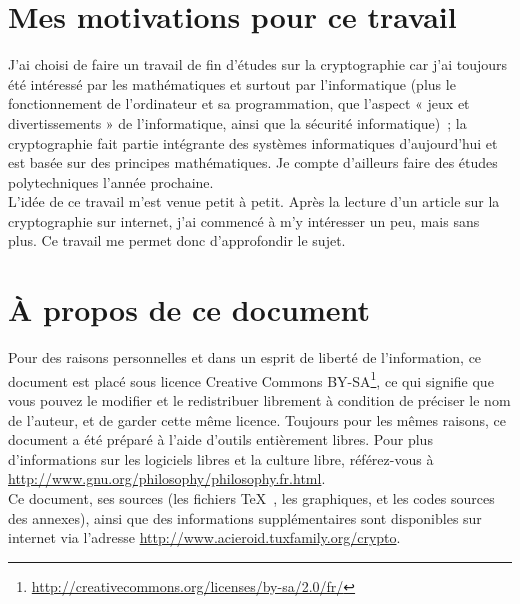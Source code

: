 
\section{Mes motivations pour ce travail}
J'ai choisi de faire un travail de fin d'études sur la cryptographie
car j'ai toujours été intéressé par les mathématiques et surtout par
l'informatique (plus le fonctionnement de l'ordinateur et sa
programmation, que l'aspect « jeux et divertissements » de
l'informatique, ainsi que la sécurité informatique)~;
la cryptographie fait partie intégrante des
systèmes informatiques d'aujourd'hui et est basée sur des principes
mathématiques. Je compte d'ailleurs faire des études polytechniques
l'année prochaine. \\ L'idée de ce travail m'est venue petit à
petit. Après la lecture d'un article sur la cryptographie sur
internet, j'ai commencé à m'y intéresser un peu, mais sans plus.
 Ce travail me permet donc d'approfondir le sujet.

\section{À propos de ce document}
Pour des raisons personnelles et dans un esprit de liberté de
l'information, ce document est placé sous licence Creative Commons
BY-SA\footnote{\url{http://creativecommons.org/licenses/by-sa/2.0/fr/}}, ce qui
signifie que vous pouvez le modifier et le redistribuer librement à
condition de préciser le nom de l'auteur, et de garder cette même
licence. Toujours pour les mêmes raisons, ce document a été préparé à
l'aide d'outils entièrement libres.
Pour plus d'informations sur les logiciels libres et la culture
libre, référez-vous à \url{http://www.gnu.org/philosophy/philosophy.fr.html}. \\
Ce document, ses sources (les fichiers \TeX~, les graphiques, et les
codes sources des annexes), ainsi que des informations supplémentaires
sont disponibles sur internet via l'adresse
\url{http://www.acieroid.tuxfamily.org/crypto}. \\


